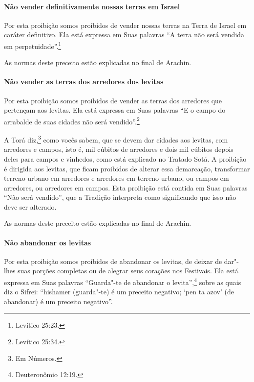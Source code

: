 \begin{multicols}{2}
\paragraph{Não vender definitivamente nossas terras em Israel}

Por esta proibição somos proibidos de vender nossas terras na Terra de
Israel em caráter definitivo. Ela está expressa em Suas palavras ``A
terra não será vendida em perpetuidade''.\footnote{Levítico 25:23.}

As normas deste preceito estão explicadas no final de Arachin\starr.

\paragraph{Não vender as terras dos arredores dos levitas\starr{}}

Por esta proibição somos proibidos de vender as terras dos arredores
que pertençam aos levitas\starr. Ela está expressa em Suas palavras ``E o
campo do arrabalde de suas cidades não será vendido''.\footnote{Levítico 25:34.}

A Torá\starr{} diz,\footnote{Em Números.} como vocês sabem, que se devem dar
cidades aos levitas\starr, com arredores e campos, isto é, mil cúbitos de
arredores e dois mil cúbitos depois deles para campos e vinhedos, como
está explicado no Tratado Sotá\starr. A proibição é dirigida aos levitas\starr, que
ficam proibidos de alterar essa demarcação, transformar terreno urbano
em arredores e arredores em terreno urbano, ou campos em arredores, ou
arredores em campos. Esta proibição está contida em Suas palavras ``Não
será vendido'', que a Tradição interpreta como significando que isso não
deve ser alterado.

As normas deste preceito estão explicadas no final de Arachin\starr.

\paragraph{Não abandonar os levitas\starr}

Por esta proibição somos proibidos de abandonar os levitas\starr, de deixar
de dar"-lhes suas porções completas ou de alegrar seus corações nos
Festivais. Ela está expressa em Suas palavras ``Guarda"-te de abandonar
o levita\starr'',\footnote{Deuteronômio 12:19.} sobre as quais diz o Sifrei\starr:
``hishamer\starr{} (guarda"-te) é um preceito negativo; `pen ta azov' (de
abandonar) é um preceito negativo''.


\end{multicols}
